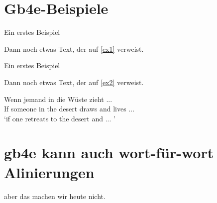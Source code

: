 \section{Gb4e-Beispiele}

\begin{exe}
    \ex Ein erstes Beispiel \label{ex1}
    \label{ex2}
    \label{ex3}
\end{exe}


Dann noch etwas Text, der auf \ref{ex1} verweist.


\begin{exe}
    \ex
    \begin{xlist}
    \ex Ein erstes Beispiel \label{ex4}
     \label{ex5}
     \label{ex6}
    \end{xlist}
\end{exe}

Dann noch etwas Text, der auf \ref{ex2} verweist.

\begin{exe}
    \ex
    \gll Wenn jemand in die Wüste zieht ... \\
    If someone in the desert draws and lives ... \\
    \trans `if one retreats to the desert and ... '
\end{exe}

\section{gb4e kann auch wort-für-wort Alinierungen}

aber das machen wir heute nicht.


